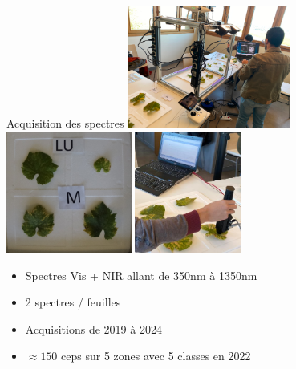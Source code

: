 \documentclass[presentation, aspectratio=169]{beamer}
\begin{document}
\begin{frame}{Acquisition des spectres}
  \includegraphics[height=4cm]{dispositif}
  \hfill
  \includegraphics[height=4cm]{planches}
  \hfill
  \includegraphics[height=4cm]{spectro}
  \begin{itemize}
  \item Spectres Vis + NIR allant de 350nm à 1350nm
  \item 2 spectres / feuilles
  \item Acquisitions de 2019 à 2024
  \item $\approx150$ ceps sur 5 zones avec 5 classes en 2022
  \end{itemize}
\end{frame}
\end{document}
